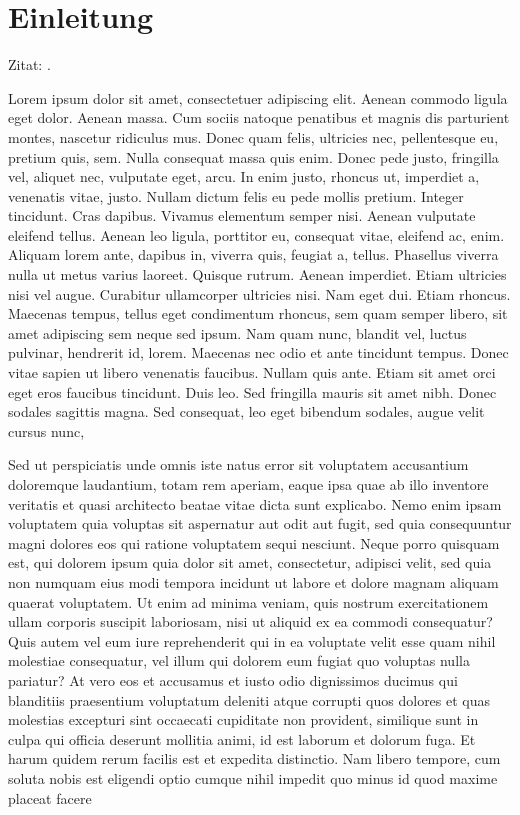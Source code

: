 \chapter{Einleitung}

Zitat: \cite{Bronstein08:TDM,LongURL,Deinzer00:VSC}.

Lorem ipsum dolor sit amet, consectetuer adipiscing elit. Aenean commodo ligula 
eget dolor. Aenean massa. Cum sociis natoque penatibus et magnis dis parturient 
montes, nascetur ridiculus mus. Donec quam felis, ultricies nec, pellentesque 
eu, pretium quis, sem. Nulla consequat massa quis enim. Donec pede justo, 
fringilla vel, aliquet nec, vulputate eget, arcu. In enim justo, rhoncus ut, 
imperdiet a, venenatis vitae, justo. Nullam dictum felis eu pede mollis pretium. 
Integer tincidunt. Cras dapibus. Vivamus elementum semper nisi. Aenean vulputate 
eleifend tellus. Aenean leo ligula, porttitor eu, consequat vitae, eleifend ac, 
enim. Aliquam lorem ante, dapibus in, viverra quis, feugiat a, tellus. Phasellus 
viverra nulla ut metus varius laoreet. Quisque rutrum. Aenean imperdiet. Etiam 
ultricies nisi vel augue. Curabitur ullamcorper ultricies nisi. Nam eget dui. 
Etiam rhoncus. Maecenas tempus, tellus eget condimentum rhoncus, sem quam semper 
libero, sit amet adipiscing sem neque sed ipsum. Nam quam nunc, blandit vel, 
luctus pulvinar, hendrerit id, lorem. Maecenas nec odio et ante tincidunt 
tempus. Donec vitae sapien ut libero venenatis faucibus. Nullam quis ante. Etiam 
sit amet orci eget eros faucibus tincidunt. Duis leo. Sed fringilla mauris sit 
amet nibh. Donec sodales sagittis magna. Sed consequat, leo eget bibendum 
sodales, augue velit cursus nunc, 

Sed ut perspiciatis unde omnis iste natus error sit voluptatem accusantium 
doloremque laudantium, totam rem aperiam, eaque ipsa quae ab illo inventore 
veritatis et quasi architecto beatae vitae dicta sunt explicabo. Nemo enim ipsam 
voluptatem quia voluptas sit aspernatur aut odit aut fugit, sed quia 
consequuntur magni dolores eos qui ratione voluptatem sequi nesciunt. Neque 
porro quisquam est, qui dolorem ipsum quia dolor sit amet, consectetur, adipisci 
velit, sed quia non numquam eius modi tempora incidunt ut labore et dolore 
magnam aliquam quaerat voluptatem. Ut enim ad minima veniam, quis nostrum 
exercitationem ullam corporis suscipit laboriosam, nisi ut aliquid ex ea commodi 
consequatur? Quis autem vel eum iure reprehenderit qui in ea voluptate velit 
esse quam nihil molestiae consequatur, vel illum qui dolorem eum fugiat quo 
voluptas nulla pariatur? At vero eos et accusamus et iusto odio dignissimos 
ducimus qui blanditiis praesentium voluptatum deleniti atque corrupti quos 
dolores et quas molestias excepturi sint occaecati cupiditate non provident, 
similique sunt in culpa qui officia deserunt mollitia animi, id est laborum et 
dolorum fuga. Et harum quidem rerum facilis est et expedita distinctio. Nam 
libero tempore, cum soluta nobis est eligendi optio cumque nihil impedit quo 
minus id quod maxime placeat facere 

